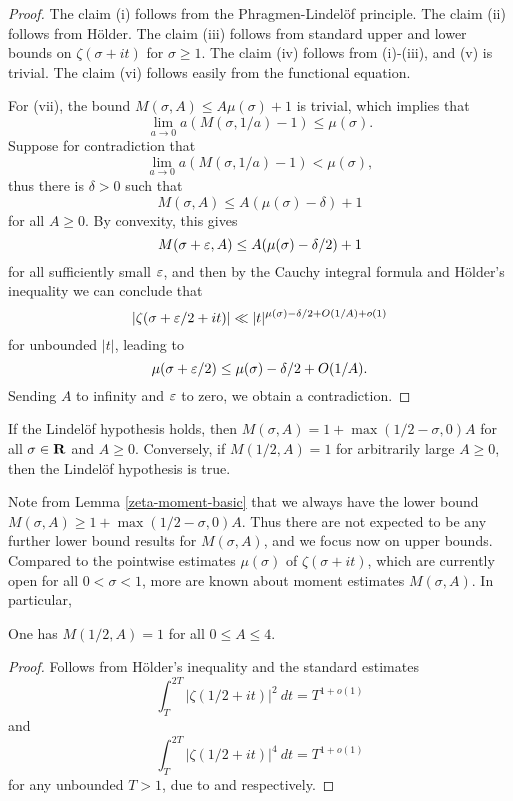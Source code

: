 \begin{proof} The claim (i) follows from the Phragmen-Lindel\"of principle.  The claim (ii) follows from H\"older.  The claim (iii) follows from standard upper and lower bounds on $\zeta(\sigma+it)$ for $\sigma \geq 1$. The claim (iv) follows from (i)-(iii), and (v) is trivial. The claim (vi) follows easily from the functional equation.

For (vii), the bound $M(\sigma,A) \leq A \mu(\sigma) + 1$ is trivial, which implies that
$$ \lim_{a \to 0} a(M(\sigma,1/a)-1) \leq \mu(\sigma).$$
Suppose for contradiction that
$$ \lim_{a \to 0} a(M(\sigma,1/a)-1) < \mu(\sigma),$$
thus there is $\delta>0$ such that
$$M(\sigma,A) \leq A (\mu(\sigma)-\delta) + 1$$
for all $A\geq 0$.  By convexity, this gives
$$M(\sigma+\varepsilon,A) \leq A (\mu(\sigma)-\delta/2) + 1$$
for all sufficiently small $\varepsilon$, and then by the Cauchy integral formula and H\"older's inequality we can conclude that
$$ |\zeta(\sigma+\varepsilon/2 +it)| \ll |t|^{\mu(\sigma)-\delta/2 + O(1/A) + o(1)} $$
for unbounded $|t|$, leading to
$$ \mu(\sigma+\varepsilon/2) \leq \mu(\sigma)-\delta/2 + O(1/A).$$
Sending $A$ to infinity and $\varepsilon$ to zero, we obtain a contradiction.
\end{proof}

\begin{corollary}\label{moment_from_lindelof} If the Lindel\"of hypothesis holds, then $M(\sigma,A) = 1 + \max(1/2-\sigma,0) A$ for all $\sigma \in \mathbf{R}$ and $A \geq 0$. Conversely, if $M(1/2, A) = 1$ for arbitrarily large $A \ge 0$, then the Lindel\"of hypothesis is true. 
\end{corollary}

Note from Lemma \ref{zeta-moment-basic} that we always have the lower bound $M(\sigma,A) \geq 1 + \max(1/2-\sigma,0) A$.  Thus there are not expected to be any further lower bound results for $M(\sigma,A)$, and we focus now on upper bounds. Compared to the pointwise estimates $\mu(\sigma)$ of $\zeta(\sigma + it)$, which are currently open for all $0 < \sigma < 1$, more are known about moment estimates $M(\sigma, A)$. In particular, 

\begin{lemma}\label{mad_known_est}One has $M(1/2,A)=1$ for all $0 \leq A \leq 4$.
\end{lemma}
\begin{proof}
Follows from H\"older's inequality and the standard estimates
$$ \int_T^{2T} |\zeta(1/2+it)|^2\ dt = T^{1+o(1)}$$
and 
$$ \int_T^{2T} |\zeta(1/2+it)|^4\ dt = T^{1+o(1)}$$
for any unbounded $T>1$, due to \cite{hardy_contributions_1916} and \cite{hardy_littlewood_approximate_1923} respectively. 
\end{proof}

